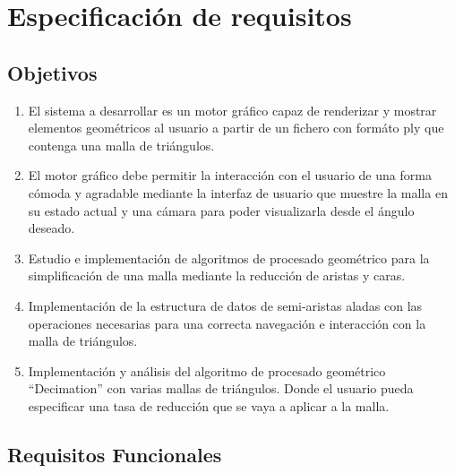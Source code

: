 \chapter{ Especificación de requisitos}

\section{Objetivos}

\begin{enumerate}[label=\textbf{\textit{OBJ-\arabic*}}]
	\item El sistema a desarrollar es un motor gráfico capaz de renderizar y mostrar elementos geométricos al usuario a partir de un fichero con formáto ply que contenga una malla de triángulos.
	\item El motor gráfico debe permitir la interacción con el usuario de una forma cómoda y agradable mediante la interfaz de usuario que muestre la malla en su estado actual y una cámara para poder visualizarla desde el ángulo deseado.
	\item Estudio e implementación de algoritmos de procesado geométrico para la simplificación de una malla mediante la reducción de aristas y caras. 
	\item Implementación de la estructura de datos de semi-aristas aladas con las operaciones necesarias para una correcta navegación e interacción con la malla de triángulos.
	\item Implementación y análisis del algoritmo de procesado geométrico ``Decimation'' con varias mallas de triángulos. Donde el usuario pueda especificar una tasa de reducción que se vaya a aplicar a la malla.
	
\end{enumerate}

\newpage
\section{ Requisitos Funcionales}


